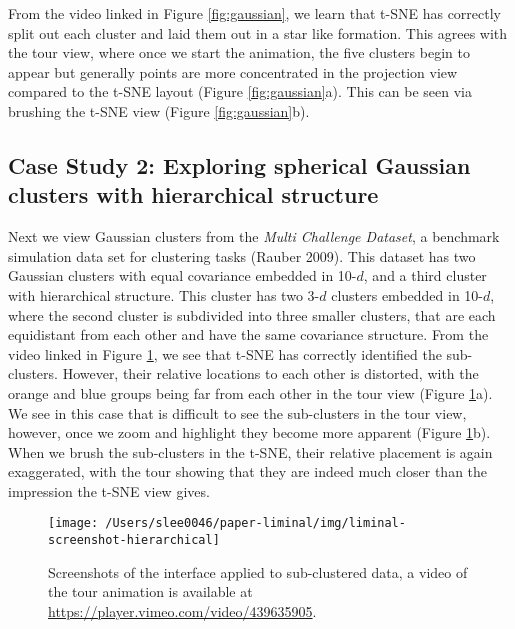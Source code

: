 \documentclass[article,notitle]{jdssv}
\begin{document}
From the video linked in Figure \ref{fig:gaussian}, we learn that t-SNE has
correctly split out each cluster and laid them out in a star like formation.
This agrees with the tour view,
where once we start the animation, the five clusters begin to appear but
generally points are more concentrated in the projection view compared to
the t-SNE layout (Figure \ref{fig:gaussian}a).
This can be seen via brushing the t-SNE view (Figure \ref{fig:gaussian}b).

\hypertarget{case-study-2-exploring-spherical-gaussian-clusters-with-hierarchical-structure}{%
\subsection{Case Study 2: Exploring spherical Gaussian clusters with hierarchical structure}\label{case-study-2-exploring-spherical-gaussian-clusters-with-hierarchical-structure}}

Next we view Gaussian clusters from the
\emph{Multi Challenge Dataset}, a benchmark simulation data set for clustering tasks
(Rauber 2009). This dataset has two Gaussian clusters with equal covariance
embedded in 10-\(d\), and a third cluster
with hierarchical structure. This cluster has two 3-\(d\) clusters embedded in
10-\(d\), where the second cluster is subdivided into three smaller clusters,
that are each equidistant from each other and have the same covariance structure.
From the video linked in Figure \ref{fig:hierarchical}, we see
that t-SNE has correctly identified the sub-clusters. However, their relative
locations to each other is distorted, with the orange and blue groups being
far from each other in the tour view (Figure \ref{fig:hierarchical}a). We see
in this case that is difficult
to see the sub-clusters in the tour view, however, once we zoom and highlight
they become more apparent (Figure \ref{fig:hierarchical}b). When we brush
the sub-clusters in the t-SNE, their
relative placement is again exaggerated, with the tour showing that they
are indeed much closer than the impression the t-SNE view gives.



\begin{figure}

{\centering \texttt{[image: /Users/slee0046/paper-liminal/img/liminal-screenshot-hierarchical]} 

}

\caption{Screenshots of the  interface applied to sub-clustered data, a video of the tour animation is available at \url{https://player.vimeo.com/video/439635905}.}\label{fig:hierarchical}
\end{figure}
\end{document}
